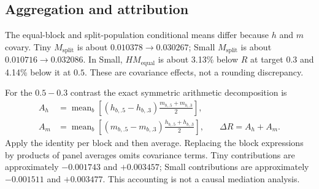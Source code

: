 \documentclass[11pt,a4paper]{article}
\theoremstyle{plain}
\theoremstyle{definition}
\theoremstyle{remark}
\newcommand{\Meq}{M_{\mathrm{equal}}}
\newcommand{\Msplit}{M_{\mathrm{split}}}
\newcommand{\revisiongenerated}{../../generated/v1.0.1}
\begin{document}
\subsection{Aggregation and attribution}
\label{sec:attribution}
The equal-block and split-population conditional means differ because $h$ and
$m$ covary. Tiny $\Msplit$ is about $0.010378\rightarrow0.030267$;
Small $\Msplit$ is about $0.010716\rightarrow0.032086$.
In Small, $H\Meq$ is about 3.13\% below $R$ at target $0.3$ and 4.14\%
below it at $0.5$. These are covariance effects, not a rounding discrepancy.
\begin{table}[tb]
\centering\small
\setlength{\tabcolsep}{3pt}
\caption{Aggregation check from block data. Population covariance uses $1/n$.
$\Msplit=R/H$ is not the historical equal-block conditional column.}
\label{tab:aggregation}

\end{table}
For the $0.5-0.3$ contrast the exact symmetric arithmetic decomposition is
\begin{align}
 A_h&=\operatorname{mean}_b\left[(h_{b,.5}-h_{b,.3})
                    \frac{m_{b,.5}+m_{b,.3}}2\right],\\
 A_m&=\operatorname{mean}_b\left[(m_{b,.5}-m_{b,.3})
                    \frac{h_{b,.5}+h_{b,.3}}2\right],
 &\hspace{1em}\Delta R=A_h+A_m.
\end{align}
Apply the identity per block and then average. Replacing the block expressions
by products of panel averages omits covariance terms. Tiny contributions are
approximately $-0.001743$ and $+0.003457$; Small contributions are approximately
$-0.001511$ and $+0.003477$. This accounting is not a causal mediation analysis.
\begin{table}[tb]
\centering\small
\setlength{\tabcolsep}{3pt}
\caption{Blockwise symmetric attribution and simultaneous blockwise directions.
The identity is checked in the generated audit; the components are descriptive,
not independent causal effects.}
\label{tab:attribution}

\end{table}
\end{document}
